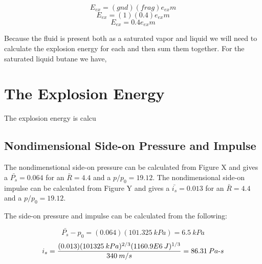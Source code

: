 \documentclass[10pt,parskip=half,
toc=sectionentrywithdots,
bibliography=totocnumbered,
captions=tableheading,numbers=noendperiod]{scrartcl}
\begin{document}
\begin{equation}E_{ex}=(gnd)(frag)e_{ex}m\end{equation}
\begin{equation}E_{ex}=(1)(0.4)e_{ex}m\end{equation}
\begin{equation}E_{ex}=0.4e_{ex}m\end{equation}

Because the fluid is present both as a saturated vapor and liquid we
will need to calculate the explosion energy for each and then sum them
together. For the saturated liquid butane we have,

\hypertarget{the-explosion-energy}{%
\section{The Explosion Energy}\label{the-explosion-energy}}

The explosion energy is calcu

\hypertarget{nondimensional-side-on-pressure-and-impulse}{%
\subsection{Nondimensional Side-on Pressure and
Impulse}\label{nondimensional-side-on-pressure-and-impulse}}

The nondimenstional side-on pressure can be calculated from Figure X and
gives a \(\bar{P_s} = 0.064\) for an \(\bar{R}=4.4\) and a
\(p/p_0 = 19.12\). The nondimensional side-on impulse can be calculated
from Figure Y and gives a \(\bar{i_s} = 0.013\) for an \(\bar{R}=4.4\)
and a \(p/p_0 = 19.12\).

The side-on pressure and impulse can be calculated from the following:

\begin{equation}\bar{P_s} - p_0 = (0.064)(101.325\:kPa) = 6.5\:kPa\end{equation}
\begin{equation}i_s = \frac{(0.013)(101325\:kPa)^{2/3}(1160.9E6\:J)^{1/3}}{340\:m/s}= 86.31\:Pa {\text -} s\end{equation}



\end{document}
